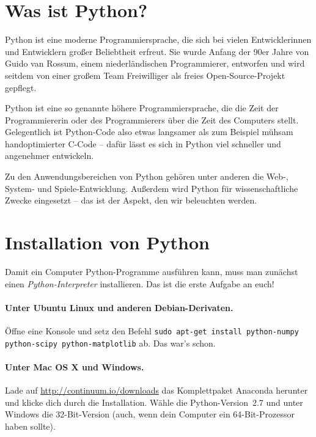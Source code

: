 \documentclass{blatt}
\begin{document}

\tableofcontents

\section{Was ist Python?}

Python ist eine moderne Programmiersprache, die sich bei vielen Entwicklerinnen
und Entwicklern großer Beliebtheit erfreut. Sie wurde Anfang der 90er Jahre von
Guido van Rossum, einem niederländischen Programmierer, entworfen und wird seitdem
von einer großem Team Freiwilliger als freies Open-Source-Projekt gepflegt.

Python ist eine so genannte höhere Programmiersprache, die die Zeit der
Programmiererin oder des Programmierers über die Zeit des Computers stellt.
Gelegentlich ist Python-Code also etwas langsamer als zum Beispiel mühsam
handoptimierter C-Code -- dafür lässt es sich in Python viel schneller und
angenehmer entwickeln.

Zu den Anwendungsbereichen von Python gehören unter anderen die Web-, System-
und Spiele-Entwicklung. Außerdem wird Python für wissenschaftliche Zwecke
eingesetzt -- das ist der Aspekt, den wir beleuchten werden.


\section{Installation von Python}

Damit ein Computer Python-Programme ausführen kann, muss man zunächst einen
\emph{Python-Interpreter} installieren. Das ist die erste Aufgabe an euch!

\paragraph{Unter Ubuntu Linux und anderen Debian-Derivaten.}
Öffne eine Konsole und setz den Befehl \texttt{sudo apt-get install
python-numpy python-scipy python-matplotlib} ab. Das war's schon.

\paragraph{Unter Mac OS X und Windows.} Lade auf
\url{http://continuum.io/downloads} das Komplettpaket Anaconda herunter und
klicke dich durch die Installation. Wähle die Python-Version~2.7 und unter
Windows die 32-Bit-Version (auch, wenn dein Computer ein 64-Bit-Prozessor haben
sollte).
\end{document}
